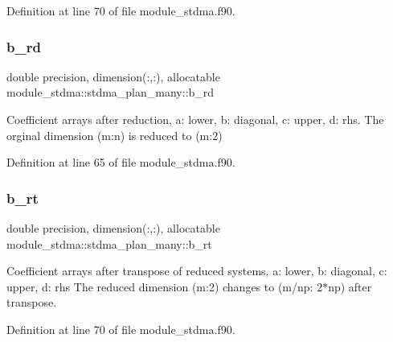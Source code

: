 Definition at line 70 of file module\+\_\+stdma.\+f90.

\mbox{\label{structmodule__stdma_1_1stdma__plan__many_ae91e0b0131f3355bf15e79ae10a0768c}} 
\subsubsection{\texorpdfstring{b\_rd}{b\_rd}}
{\footnotesize\ttfamily double precision, dimension(\+:,\+:), allocatable module\+\_\+stdma\+::stdma\+\_\+plan\+\_\+many\+::b\+\_\+rd}



Coefficient arrays after reduction, a\+: lower, b\+: diagonal, c\+: upper, d\+: rhs. The orginal dimension (m\+:n) is reduced to (m\+:2) 



Definition at line 65 of file module\+\_\+stdma.\+f90.

\mbox{\label{structmodule__stdma_1_1stdma__plan__many_ac3de0f8c6e9ef01ed0fc824cfdfd93c8}} 
\subsubsection{\texorpdfstring{b\_rt}{b\_rt}}
{\footnotesize\ttfamily double precision, dimension(\+:,\+:), allocatable module\+\_\+stdma\+::stdma\+\_\+plan\+\_\+many\+::b\+\_\+rt}



Coefficient arrays after transpose of reduced systems, a\+: lower, b\+: diagonal, c\+: upper, d\+: rhs The reduced dimension (m\+:2) changes to (m/np\+: 2$\ast$np) after transpose. 



Definition at line 70 of file module\+\_\+stdma.\+f90.

\mbox{\label{structmodule__stdma_1_1stdma__plan__many_ab9430b05c4d593a1b5077be4d2d6d25d}} 
